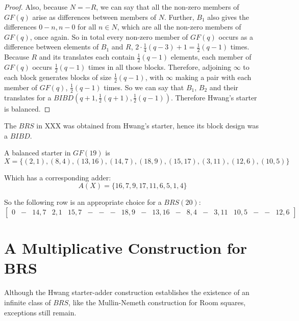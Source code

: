 \documentclass[11pt, a4paper]{book}\usepackage[]{graphicx}\usepackage[]{xcolor}
\newcounter{example}
\begin{document}
\begin{proof}
Also, because $N = -R$, we can say that all the non-zero
members of $GF(q)$ arise as differences between members of
$N$. Further, $B_1$ also gives the differences
$0 - n, n - 0$ for all $n\in N$, which are all the non-zero
members
of $GF(q)$, once again. So in total every non-zero member of
$GF(q)$ occurs as a difference between elements of $B_1$ and
$R$, $2 \cdot \frac{1}{4}(q - 3) + 1 = \frac{1}{2} (q - 1)$
times.  Because $R$ and its translates each contain
$\frac{1}{2}(q - 1)$ elements, each member of $GF(q)$ occurs
$\frac{1}{2}(q - 1)$ times in all those blocks. Therefore,
adjoining $\infty$ to each block generates blocks of size
$\frac{1}{2}(q - 1)$, with $\infty$ making a pair with each
member of $GF(q)$, $\frac{1}{2}(q - 1)$ times.  So we can say
that $B_1$, $B_2$ and their translates for a
$BIBD(q  +1, \frac{1}{2}(q + 1), \frac{1}{2}(q - 1))$.
Therefore Hwang’s starter is balanced. 
\end{proof}

The $BRS$ in XXX was obtained from Hwang’s starter,
hence its block design was a $BIBD$.

\begin{example}
A balanced starter in $GF(19)$ is
\begin{equation}
X = \{(2,1),(8,4),(13,16),(14,7),(18,9),(15,17),(3,11),(12,6),(10,5)\}
\end{equation}

Which has a corresponding adder:
\begin{equation}
A(X) = \{16,7,9,17,11,6,5,1,4\}
\end{equation}

So the following row is an appropriate choice for a
$BRS(20)$:
\begin{equation}
 \begin{bmatrix}
   0 & - & 14,7 & 2,1 & 15,7 & - & - & - & 18,9 & - & 13,16 & - & 8,4 & - & 3,11 & 10,5 & - & - & 12,6
 \end{bmatrix}
\end{equation}

\end{example}

\section{A Multiplicative Construction for BRS}

Although the Hwang starter-adder construction establishes
the existence of an infinite class of $BRS$, like the
Mullin-Nemeth construction for Room squares, exceptions still
remain.
\end{document}

